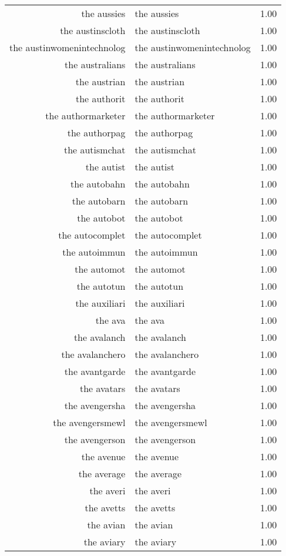 \begin{table}[ht]
\begin{tabular}{rlr}
  the aussies & the aussies & 1.00 \\ 
  the austinscloth & the austinscloth & 1.00 \\ 
  the austinwomenintechnolog & the austinwomenintechnolog & 1.00 \\ 
  the australians & the australians & 1.00 \\ 
  the austrian & the austrian & 1.00 \\ 
  the authorit & the authorit & 1.00 \\ 
  the authormarketer & the authormarketer & 1.00 \\ 
  the authorpag & the authorpag & 1.00 \\ 
  the autismchat & the autismchat & 1.00 \\ 
  the autist & the autist & 1.00 \\ 
  the autobahn & the autobahn & 1.00 \\ 
  the autobarn & the autobarn & 1.00 \\ 
  the autobot & the autobot & 1.00 \\ 
  the autocomplet & the autocomplet & 1.00 \\ 
  the autoimmun & the autoimmun & 1.00 \\ 
  the automot & the automot & 1.00 \\ 
  the autotun & the autotun & 1.00 \\ 
  the auxiliari & the auxiliari & 1.00 \\ 
  the ava & the ava & 1.00 \\ 
  the avalanch & the avalanch & 1.00 \\ 
  the avalanchero & the avalanchero & 1.00 \\ 
  the avantgarde & the avantgarde & 1.00 \\ 
  the avatars & the avatars & 1.00 \\ 
  the avengersha & the avengersha & 1.00 \\ 
  the avengersmewl & the avengersmewl & 1.00 \\ 
  the avengerson & the avengerson & 1.00 \\ 
  the avenue & the avenue & 1.00 \\ 
  the average & the average & 1.00 \\ 
  the averi & the averi & 1.00 \\ 
  the avetts & the avetts & 1.00 \\ 
  the avian & the avian & 1.00 \\ 
  the aviary & the aviary & 1.00 \\ 

\end{tabular}
\end{table}
